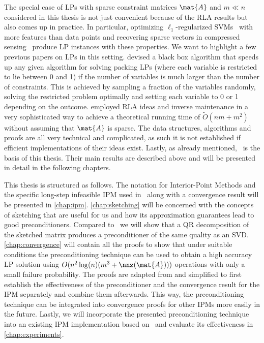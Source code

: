 The special case of LPs with sparse constraint matrices \(\mat{A}\) and \(m \ll n\) considered in this thesis is not just convenient because of the RLA results but also comes up in practice.
In particular, optimizing \(\ell_1\)-regularized SVMs~\cite{ZhuRossetTibshiraniHastie-1normSupportVectorMachines} with more features than data points and recovering sparse vectors in compressed sensing~\cite{YangZhang-l1ProblemsInCompressiveSensing} produce LP instances with these properties.
We want to highlight a few previous papers on LPs in this setting. \textcite{LondonVardiWiermanYi-PackingLinearPrograms} devised a black box algorithm that speeds up any given algorithm for solving packing LPs (where each variable is restricted to lie between 0 and 1) if the number of variables is much larger than the number of constraints.
This is achieved by sampling a fraction of the variables randomly, solving the restricted problem optimally and setting each variable to 0 or 1 depending on the outcome.
\textcite{Sidford-TallDenseLinearPrograms} employed RLA ideas and inverse maintenance in a very sophisticated way to achieve a theoretical running time of \(\tilde{O}(nm + m^2)\) without assuming that \(\mat{A}\) is sparse.
The data structures, algorithms and proofs are all very technical and complicated, as such it is not established if efficient implementations of their ideas exist.
Lastly, as already mentioned,~\cite{Avron-FasterRandomizedInfeasibleIPMs} is the basis of this thesis.
Their main results are described above and will be presented in detail in the following chapters.

This thesis is structured as follows.
The notation for Interior-Point Methods and the specific long-step infeasible IPM used in~\cite{Monteiro-ConvergenceAnalysisLongStepInfeasibleIPMs} along with a convergence result will be presented in \cref{chap:ipm}.
\cref{chap:sketching} will be concerned with the concepts of sketching that are useful for us and how its approximation guarantees lead to good preconditioners.
Compared to~\cite{Avron-FasterRandomizedInfeasibleIPMs} we will show that a QR decomposition of the sketched matrix produces a preconditioner of the same quality as an SVD.
\cref{chap:convergence} will contain all the proofs to show that under suitable conditions the preconditioning technique can be used to obtain a high accuracy LP solution using \(O(n^2 \log(n) (m^3 + \nnz(\mat{A})))\) operations with only a small failure probability.
The proofs are adapted from \textcite{Avron-FasterRandomizedInfeasibleIPMs} and simplified to first establish the effectiveness of the preconditioner and the convergence result for the IPM separately and combine them afterwards.
This way, the preconditioning technique can be integrated into convergence proofs for other IPMs more easily in the future.
Lastly, we will incorporate the presented preconditioning technique into an existing IPM implementation based on~\cite{AndersenAndersen-MosekInteriorPointMethod} and evaluate its effectiveness in \cref{chap:experiments}.
